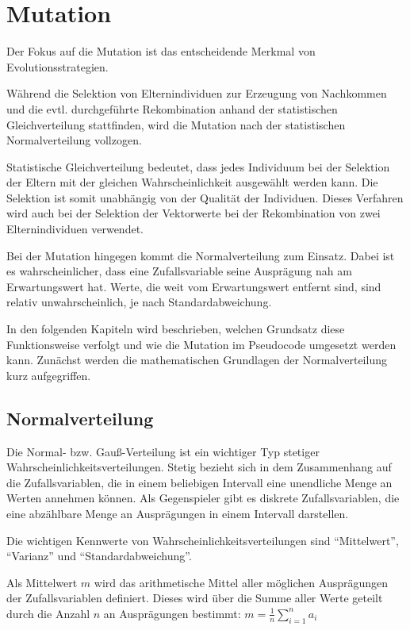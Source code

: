 
\section{Mutation}
\label{sec:mutation}

Der Fokus auf die Mutation ist das entscheidende Merkmal von Evolutionsstrategien.

Während die Selektion von Elternindividuen zur Erzeugung von Nachkommen und die evtl. durchgeführte Rekombination anhand der statistischen Gleichverteilung stattfinden, wird die Mutation nach der statistischen Normalverteilung vollzogen.

Statistische Gleichverteilung bedeutet, dass jedes Individuum bei der Selektion der Eltern mit der gleichen Wahrscheinlichkeit ausgewählt werden kann. Die Selektion ist somit unabhängig von der Qualität der Individuen. Dieses Verfahren wird auch bei der Selektion der Vektorwerte bei der Rekombination von zwei Elternindividuen verwendet.

Bei der Mutation hingegen kommt die Normalverteilung zum Einsatz. Dabei ist es wahrscheinlicher, dass eine Zufallsvariable seine Ausprägung nah am Erwartungswert hat. Werte, die weit vom Erwartungswert entfernt sind, sind relativ unwahrscheinlich, je nach Standardabweichung.

In den folgenden Kapiteln wird beschrieben, welchen Grundsatz diese Funktionsweise verfolgt und wie die Mutation im Pseudocode umgesetzt werden kann.
Zunächst werden die mathematischen Grundlagen der Normalverteilung kurz aufgegriffen.

\subsection{Normalverteilung}

Die Normal- bzw. Gauß-Verteilung ist ein wichtiger Typ stetiger Wahrscheinlichkeitsverteilungen.
Stetig bezieht sich in dem Zusammenhang auf die Zufallsvariablen, die in einem beliebigen Intervall eine unendliche Menge an Werten annehmen können.
Als Gegenspieler gibt es diskrete Zufallsvariablen, die eine abzählbare Menge an Ausprägungen in einem Intervall darstellen.

Die wichtigen Kennwerte von Wahrscheinlichkeitsverteilungen sind \enquote{Mittelwert}, \enquote{Varianz} und \enquote{Standardabweichung}.

Als Mittelwert $m$ wird das arithmetische Mittel aller möglichen Ausprägungen der Zufallsvariablen definiert. Dieses wird über die Summe aller Werte geteilt durch die Anzahl $n$ an Ausprägungen bestimmt: $m = \frac{1}{n} \sum_{i=1}^n a_i$

